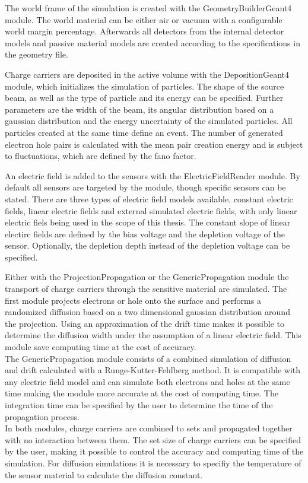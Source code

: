 The world frame of the simulation is created with the GeometryBuilderGeant4 module. The world material can be either air or vacuum with a configurable world margin percentage.
Afterwards all detectors from the internal detector models and passive material models are created according to the specifications in the geometry file.

Charge carriers are deposited in the active volume with the DepositionGeant4 module, which initializes the simulation of particles. The shape of the source beam, as well
as the type of particle and its energy can be specified. Further parameters are the width of the beam, its angular distribution based on a gaussian distribution and the energy
uncertainty of the simulated particles. All particles created at the same time define an event. The number of generated electron hole pairs is calculated with the
mean pair creation energy and is subject to fluctuations, which are defined by the fano factor.

An electric field is added to the sensors with the ElectricFieldReader module. By default all sensors are targeted by the module, though specific sensors can be stated.
There are three types of electric field models available, constant electric fields, linear electric fields and external simulated electric fields, with only
linear electric fiels being used in the scope of this thesis. The constant slope of linear electirc fields are defined by the bias voltage and the
depletion voltage of the sensor. Optionally, the depletion depth instead of the depletion voltage can be specified.

Either with the ProjectionPropagation or the GenericPropagation module the transport of charge carriers through the sensitive material are simulated.
The first module projects electrons or hole onto the surface and performs a randomized diffusion based on a two dimensional gaussian distribution around
the projection. Using an approximation of the drift time makes it possible to determine the diffusion width under the assumption of a linear electric field. This
module save computing time at the cost of accuracy. \\
The GenericPropagation module consists of a combined simulation of diffusion and drift calculated with a Runge-Kutter-Fehlberg method.
It is compatible with any electric field model and can simulate both electrons and holes
at the same time making the module
more accurate at the cost of computing time. The integration time can be specified by the user to determine the time of the propagation process. \\
In both modules, charge carriers are combined to sets and propagated together with no interaction between them. The set size of charge carriers can be specified by the user,
making it possible to control the accuracy and computing time of the simulation. For diffusion simulations it is necessary to specifiy the temperature of the sensor material
to calculate the diffusion constant.


